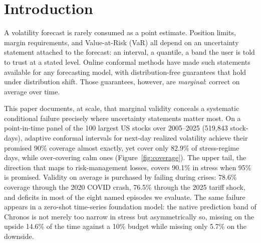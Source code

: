 \section{Introduction}\label{sec:intro}

A volatility forecast is rarely consumed as a point estimate. Position
limits, margin requirements, and Value-at-Risk (VaR) all depend on an
uncertainty statement attached to the forecast: an interval, a quantile, a
band the user is told to trust at a stated level. Online conformal methods
\citep{gibbs2021adaptive, zaffran2022adaptive, bhatnagar2023improved} have
made such statements available for any forecasting model, with
distribution-free guarantees that hold under distribution shift. Those
guarantees, however, are \emph{marginal}: correct on average over time.

This paper documents, at scale, that marginal validity conceals a
systematic conditional failure precisely where uncertainty statements
matter most. On a point-in-time panel of the 100 largest US
stocks over 2005--2025 (519{,}843 stock-days), adaptive conformal intervals
for next-day realized volatility achieve their promised 90\% coverage
almost exactly, yet cover only 82.9\% of stress-regime days, while
over-covering calm ones (Figure~\ref{fig:coverage}). The upper tail, the
direction that maps to risk-management losses, covers 90.1\% in stress when
95\% is promised. Validity on average is purchased by failing during
crises: 78.6\% coverage through the 2020 COVID crash, 76.5\% through the
2025 tariff shock, and deficits in most of the eight named episodes we
evaluate. The
same failure appears in a zero-shot time-series foundation model: the native
prediction band of Chronos \citep{ansari2024chronos} is not merely too
narrow in stress but asymmetrically so, missing on the upside 14.6\% of
the time against a 10\% budget while missing only 5.7\% on the downside.

